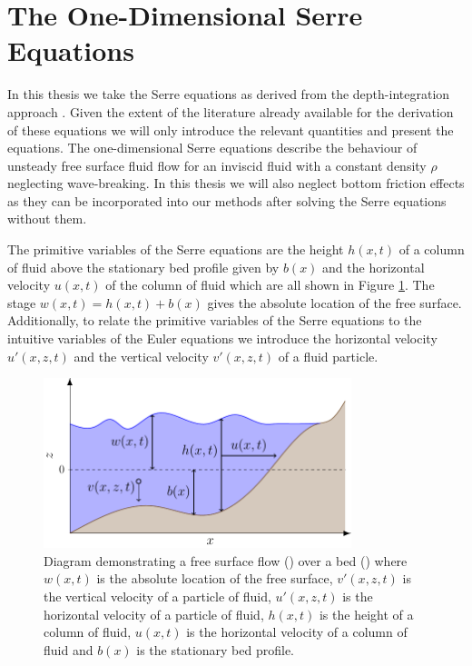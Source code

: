 \section{The One-Dimensional Serre Equations}
In this thesis we take the Serre equations as derived from the depth-integration approach \cite{Su-Gardener-1969-536,Seabra-Santos-etal-1987-117}. Given the extent of the literature already available for the derivation of these equations we will only introduce the relevant quantities and present the equations. The one-dimensional Serre equations describe the behaviour of unsteady free surface fluid flow for an inviscid fluid with a constant density $\rho$ neglecting wave-breaking. In this thesis we will also neglect bottom friction effects as they can be incorporated into our methods after solving the Serre equations without them. 

The primitive variables of the Serre equations are the height $h(x,t)$ of a column of fluid above the stationary bed profile given by $b(x)$ and the horizontal velocity $u(x,t)$ of the column of fluid which are all shown in Figure \ref{fig:WaterModel}. The stage $w(x,t) = h(x,t) + b(x)$ gives the absolute location of the free surface. Additionally, to relate the primitive variables of the Serre equations to the intuitive variables of the Euler equations we introduce the horizontal velocity $u'(x,z,t)$ and the vertical velocity $v'(x,z,t)$ of a fluid particle.

\begin{figure}
	\centering
	\includegraphics[width=0.8\textwidth]{./chp2/figures/SerreModel.pdf}
	\caption{Diagram demonstrating a free surface flow () over a bed () where $w(x,t)$ is the absolute location of the free surface, $v'(x,z,t)$ is the vertical velocity of a particle of fluid, $u'(x,z,t)$ is the horizontal velocity of a particle of fluid, $h(x,t)$ is the height of a column of fluid, $u(x,t)$ is the horizontal velocity of a column of fluid and $b(x)$ is the stationary bed profile.}
	\label{fig:WaterModel}
\end{figure}

